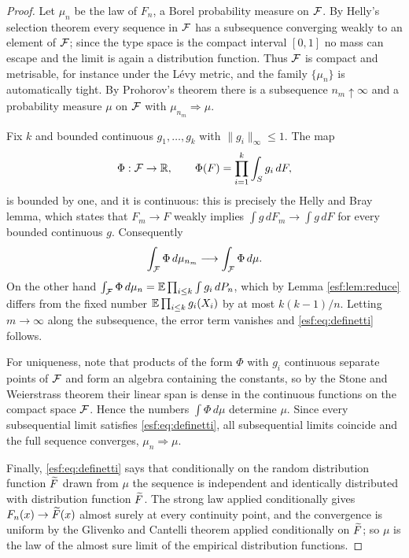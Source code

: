 \begin{proof}
Let $\mu_n$ be the law of $F_n$, a Borel probability measure on $\mathcal{F}$. By Helly's
selection theorem every sequence in $\mathcal{F}$ has a subsequence converging weakly to an
element of $\mathcal{F}$; since the type space is the compact interval $[0,1]$ no mass can
escape and the limit is again a distribution function. Thus $\mathcal{F}$ is compact and
metrisable, for instance under the L\'evy metric, and the family $\{\mu_n\}$ is
automatically tight. By Prohorov's theorem there is a subsequence $n_m \uparrow \infty$
and a probability measure $\mu$ on $\mathcal{F}$ with $\mu_{n_m} \Rightarrow \mu$.

Fix $k$ and bounded continuous $g_1,\dots,g_k$ with $\|g_i\|_\infty \le 1$. The map
\[
\Phi : \mathcal{F} \to \mathbb{R}, \qquad \Phi(F) = \prod_{i=1}^{k} \int_S g_i \, dF ,
\]
is bounded by one, and it is continuous: this is precisely the Helly and Bray lemma,
which states that $F_m \to F$ weakly implies $\int g \, dF_m \to \int g \, dF$ for
every bounded continuous $g$. Consequently
\[
\int_{\mathcal{F}} \Phi \, d\mu_{n_m} \longrightarrow \int_{\mathcal{F}} \Phi \, d\mu .
\]
On the other hand $\int_{\mathcal{F}} \Phi \, d\mu_{n} = \mathbb{E} \prod_{i \le k} \int g_i \, dP_n$,
which by Lemma \ref{esf:lem:reduce} differs from the fixed number
$\mathbb{E} \prod_{i \le k} g_i(X_i)$ by at most $k(k-1)/n$. Letting $m \to \infty$ along the
subsequence, the error term vanishes and \eqref{esf:eq:definetti} follows.

For uniqueness, note that products of the form $\Phi$ with $g_i$ continuous separate
points of $\mathcal{F}$ and form an algebra containing the constants, so by the Stone and
Weierstrass theorem their linear span is dense in the continuous functions on the
compact space $\mathcal{F}$. Hence the numbers $\int \Phi \, d\mu$ determine $\mu$. Since
every subsequential limit satisfies \eqref{esf:eq:definetti}, all subsequential limits
coincide and the full sequence converges, $\mu_n \Rightarrow \mu$.

Finally, \eqref{esf:eq:definetti} says that conditionally on the random distribution
function $\widetilde{F}$ drawn from $\mu$ the sequence is independent and identically
distributed with distribution function $\widetilde{F}$. The strong law applied conditionally
gives $F_n(x) \to \widetilde{F}(x)$ almost surely at every continuity point, and the
convergence is uniform by the Glivenko and Cantelli theorem applied conditionally on
$\widetilde{F}$; so $\mu$ is the law of the almost sure limit of the empirical distribution
functions.


\end{proof}
